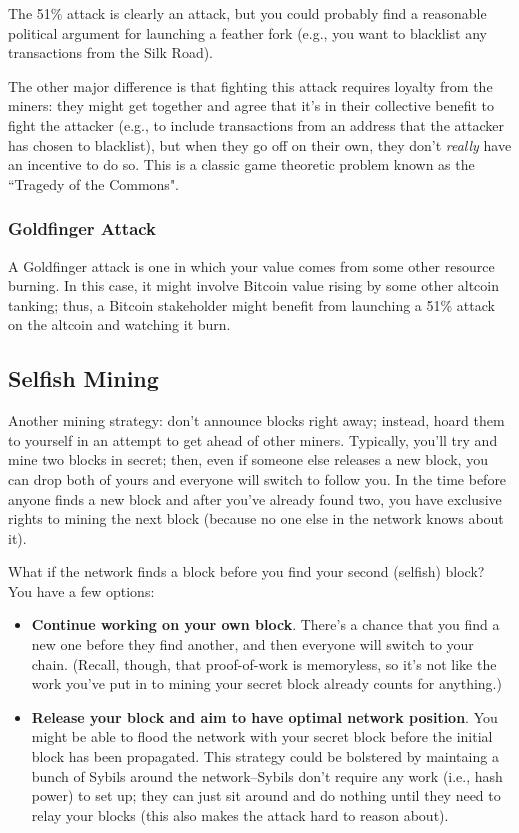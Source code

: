 \documentclass[12pt]{article}
\begin{document}
The 51\% attack is clearly an attack, but you could probably find a reasonable political argument for launching a feather fork (e.g., you want to blacklist any transactions from the Silk Road).

The other major difference is that fighting this attack requires loyalty from the miners: they might get together and agree that it's in their collective benefit to fight the attacker (e.g., to include transactions from an address that the attacker has chosen to blacklist), but when they go off on their own, they don't \textit{really} have an incentive to do so. This is a classic game theoretic problem known as the ``Tragedy of the Commons".

\subsubsection*{Goldfinger Attack}

A Goldfinger attack is one in which your value comes from some other resource burning. In this case, it might involve Bitcoin value rising by some other altcoin tanking; thus, a Bitcoin stakeholder might benefit from launching a 51\% attack on the altcoin and watching it burn.

\subsection*{Selfish Mining}

Another mining strategy: don't announce blocks right away; instead, hoard them to yourself in an attempt to get ahead of other miners. Typically, you'll try and mine two blocks in secret; then, even if someone else releases a new block, you can drop both of yours and everyone will switch to follow you. In the time before anyone finds a new block and after you've already found two, you have exclusive rights to mining the next block (because no one else in the network knows about it).

What if the network finds a block before you find your second (selfish) block? You have a few options:
\begin{itemize}
\item \textbf{Continue working on your own block}. There's a chance that you find a new one before they find another, and then everyone will switch to your chain. (Recall, though, that proof-of-work is memoryless, so it's not like the work you've put in to mining your secret block already counts for anything.)
\item \textbf{Release your block and aim to have optimal network position}. You might be able to flood the network with your secret block before the initial block has been propagated. This strategy could be bolstered by maintaing a bunch of Sybils around the network--Sybils don't require any work (i.e., hash power) to set up; they can just sit around and do nothing until they need to relay your blocks (this also makes the attack hard to reason about).
\end{itemize}
\end{document}
